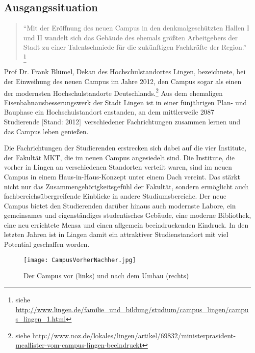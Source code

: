 \subsection{Ausgangssituation}
\label{sec:Ausgangssituation}

\begin{quote}
"`Mit der Eröffnung des neuen Campus in den denkmalgeschützten Hallen I und II wandelt 
sich das Gebäude des ehemals größten Arbeitgebers der Stadt zu einer 
Talentschmiede für die zukünftigen Fachkräfte der Region."'
\footnote{siehe \url{http://www.lingen.de/familie_und_bildung/studium/campus_lingen/campus_lingen_1.html}}
\end{quote}

Prof Dr. Frank Blümel, Dekan des Hochschulstandortes Lingen, bezeichnete, bei der Einweihung
des neuen Campus im Jahre 2012, den Campus sogar als einen der modernsten Hochschulstandorte
Deutschlands.\footnote{siehe \url{http://www.noz.de/lokales/lingen/artikel/69832/ministerprasident-mcallister-vom-campus-lingen-beeindruckt}}
Aus dem ehemaligen Eisenbahnausbesserungswerk der Stadt Lingen ist in einer fünjährigen Plan- und Bauphase
ein Hochschulstandort enstanden, an dem mittlerweile 2087 Studierende [Stand: 2012]\footnotemark\ verschiedener
Fachrichtungen zusammen lernen und das Campus leben genießen.

Die Fachrichtungen der Studierenden erstrecken sich dabei auf die vier Institute, der Fakultät \ac{MKT}, die im neuen Campus angesiedelt sind. Die Institute, die vorher in Lingen an verschiedenen
Standorten verteilt waren, sind im neuen Campus in einem Haus-in-Haus-Konzept unter einem Dach vereint.
Das stärkt nicht nur das Zusammengehörigkeitsgefühl der Fakultät, sondern ermöglicht auch fachbereichsübergreifende
Einblicke in andere Studiumsbereiche. Der neue Campus bietet den Studierenden darüber hinaus auch modernste
Labore, ein gemeinsames und eigenständiges studentisches Gebäude, eine moderne Bibliothek, eine neu errichtete Mensa
und einen allgemein beeindruckenden Eindruck. In den letzten Jahren ist in Lingen damit ein attraktiver
Studienstandort mit viel Potential geschaffen worden.

\begin{figure}[htb] 
\centering
\texttt{[image: CampusVorherNachher.jpg]}
\caption[Vorher-Nachher-Vergleich]{Der Campus vor (links) und nach dem Umbau (rechts)\protect\footnotemark}
\label{fig:CampusVorher}
\end{figure}
